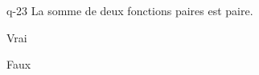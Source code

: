 \begin{truefalse}{q-23}
La somme de deux fonctions paires est paire.
\item* Vrai
\item Faux
\end{truefalse}

